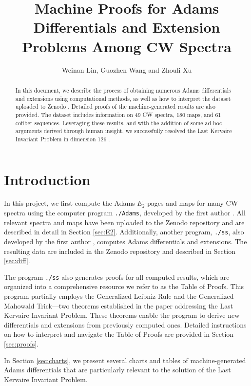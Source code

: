 \documentclass{amsart}
\title[Machine Proofs for Adams Differentials and Extension Problems]{Machine Proofs for Adams Differentials and Extension Problems Among CW Spectra}
\author{Weinan Lin, Guozhen Wang and Zhouli Xu}
\date{}
\numberwithin{equation}{section}
\begin{document}
\begin{abstract}
In this document, we describe the process of obtaining numerous Adams differentials and extensions using computational methods, as well as how to interpret the dataset uploaded to Zenodo \cite{LWXZenodo}.
Detailed proofs of the machine-generated results are also provided. The dataset includes information on 49 CW spectra, 180 maps, and 61 cofiber sequences. Leveraging these results, and with the addition of some ad hoc arguments derived through human insight, we successfully resolved the Last Kervaire Invariant Problem in dimension 126 \cite{LWX126}.
\end{abstract}

\maketitle

\section{Introduction}
In this project, we first compute the Adams $E_2$-pages and maps for many CW spectra using the computer program \texttt{./Adams}, developed by the first author \cite{LinProgram}. All relevant spectra and maps have been uploaded to the Zenodo repository \cite{LWXZenodo} and are described in detail in Section \ref{sec:E2}. Additionally, another program, \texttt{./ss}, also developed by the first author \cite{LinProgram}, computes Adams differentials and extensions. The resulting data are included in the Zenodo repository and described in Section \ref{sec:diff}.

The program \texttt{./ss} also generates proofs for all computed results, which are organized into a comprehensive resource we refer to as the Table of Proofs. This program partially employs the Generalized Leibniz Rule and the Generalized Mahowald Trick—two theorems established in the paper \cite{LWX126} addressing the Last Kervaire Invariant Problem. These theorems enable the program to derive new differentials and extensions from previously computed ones. Detailed instructions on how to interpret and navigate the Table of Proofs are provided in Section \ref{sec:proofs}.

In Section \ref{sec:charts}, we present several charts and tables of machine-generated Adams differentials that are particularly relevant to the solution of the Last Kervaire Invariant Problem.
\end{document}
